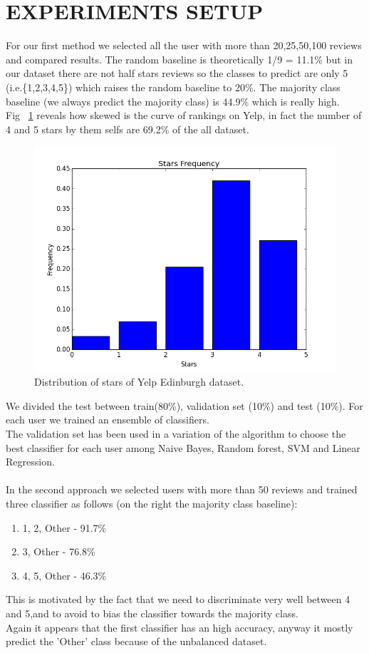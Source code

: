 \documentclass[a4paper, 10pt, conference]{ieeeconf}      %
\begin{document}
\section{EXPERIMENTS SETUP}
For our first method we selected all the user with more than 20,25,50,100 reviews and compared results. The random baseline is theoretically 1/9 = 11.1\% but in our dataset there are not half stars reviews so the classes to predict are only 5 (i.e.\{1,2,3,4,5\}) which raises the random baseline to 20\%.  The majority class baseline (we always predict the majority class) is 44.9\% which is really high.\\
 Fig ~\ref{histStars} reveals how skewed is the curve of rankings on Yelp, in fact the number of 4 and 5 stars by them selfs are 69.2\% of the all dataset.
 \begin{figure}[thpb]
 	\centering
 	\includegraphics[scale=0.4]{img/starsFrequency.png}
 	\caption{Distribution of stars of Yelp Edinburgh dataset.}
 	\label{histStars}
 \end{figure}
We divided the test between train(80\%), validation set (10\%) and test (10\%).
For each user we trained an ensemble of classifiers.\\
The validation set has been used in a variation of the algorithm to choose the best classifier for each user among Naive Bayes, Random forest, SVM and Linear Regression.\\\\
In the second approach we selected users with more than 50 reviews and trained three classifier as follows (on the right the majority class baseline):
\begin{enumerate}
	\item 1, 2, Other - 91.7\%
	\item 3, Other - 76.8\%
	\item 4, 5, Other - 46.3\%
\end{enumerate}
This is motivated by the fact that we need to discriminate very well between 4 and 5,and to avoid to bias the classifier towards the majority class.\\
Again it appears that the first classifier has an high accuracy, anyway it mostly predict the 'Other' class because of the unbalanced dataset.\\
\end{document}
